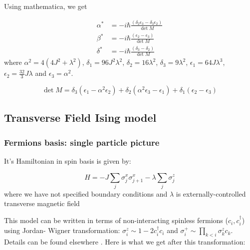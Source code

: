 \documentclass[11pt,a4paper]{article}
\begin{document}
Using mathematica, we get 



\begin{align}
\alpha^* &= - i \hbar \frac{  \left(\delta _2 \epsilon _3 -\delta _3 \epsilon _2\right)}{\det M} \\
  \beta^* &= -i \hbar \frac{ \left(\epsilon _2-\epsilon _3\right) }{\det M} \\
 \delta^*  &=- i \hbar \frac{ \left(\delta _3-\delta _2\right) }{\det M}
\end{align}
where  $\alpha^2= 4 (4 J^2 +  \lambda ^2) $, $\delta_1= 96 J^2 \lambda^2$, $\delta_2= 16 \lambda^2$, $\delta_3= 9 \lambda^2$, $\epsilon_1= 64 J \lambda^3$, $\epsilon_2= \frac{32}{3} J \lambda$ and $\epsilon_3= \alpha^2$.



\begin{equation}
\det M = \delta _3 \left(\epsilon _1-\alpha ^2 \epsilon _2\right)+\delta _2 \left(\alpha ^2 \epsilon _3-\epsilon _1\right)+\delta _1 \left(\epsilon
   _2-\epsilon _3\right)
\end{equation}

\subsection{Transverse Field Ising model}
\subsubsection{Fermions basis: single particle picture}
It's Hamiltonian in spin basis is given by:

\begin{equation}
H= -J \sum_{j} \sigma_j^x \sigma_{j+1}^x - \lambda \sum_{j} \sigma_j^z 
\end{equation}
where we have not specified boundary conditions and $\lambda$ is externally-controlled transverse magnetic field

This model can be written in terms of non-interacting spinless fermions ($c_i, c^{\dagger}_i $) using Jordan- Wigner transformation: $\sigma_i^z \sim 1 - 2 c^{\dagger}_i c_i   $ and $\sigma_i^+ \sim \prod_{k<i} \sigma_k^z c_k   $. Details can be found elsewhere \cite{sachdev2007quantum}. Here is what we get after this transformation:
\end{document}
